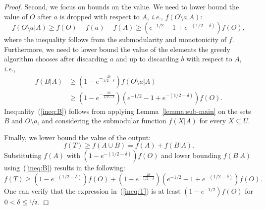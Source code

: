 \begin{proof}
	Second, we focus on bounds on the value.
	We need to lower bound the value of $O$ after $a$ is dropped with respect to $A$, {\em i.e.}, $f(O \setminus a | A)$:
	\begin{equation}
		f(O \setminus a | A) \geq f(O) - f(a) - f(A) \geq (e^{-1/2} - 1 + e^{-(1/2 - \delta)})f(O),
	\end{equation}
	where the inequality follows from the submodularity and monotonicity of $f$.
	Furthermore, we need to lower bound the value of the elements the greedy algorithm chooses after discarding $a$ and up to discarding $b$ with respect to $A$, {\em i.e.},	
	\begin{align}
		\label{ineq:B}
		f(B|A)	& \geq (1 - e^{-\frac{2\delta}{1/2 - \delta}})f(O \setminus a | A)
		\\ 		& \geq (1 - e^{-\frac{2\delta}{1/2 - \delta}})(e^{-1/2} - 1 + e^{-(1/2 - \delta)})f(O).
		\nonumber
	\end{align}	
	Inequality~(\ref{ineq:B}) follows from applying Lemma~\ref{lemma:sub-main} on the sets $B$ and $O \setminus a$, and considering the submodular function $f(X|A)$ for every $X \subseteq U$.
	
	Finally, we lower bound the value of the output:
	\begin{equation}
		f(T) \geq f(A \cup B) = f(A) + f(B | A).
	\end{equation}	
	Substituting $f(A)$ with $(1 - e^{-(1/2 - \delta)})f(O)$ and lower bounding $f(B|A)$ using~(\ref{ineq:B}) results in the following:
	\begin{equation}
		\label{ineq:T}
		f(T) \geq (1 - e^{-(1/2 - \delta)})f(O) + (1 - e^{-\frac{2\delta}{1/2 - \delta}})(e^{-1/2} - 1 + e^{-(1/2 - \delta)})f(O).
	\end{equation}
	One can verify that the expression in~(\ref{ineq:T}) is at least $(1-e^{-1/2})f(O)$ for $0 < \delta \leq \nicefrac[]{1}{2}$.
\end{proof}

